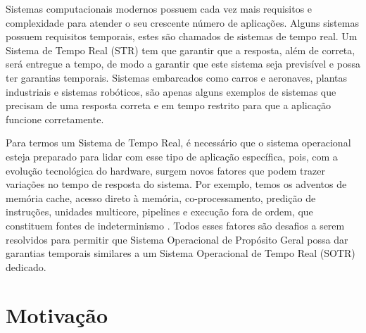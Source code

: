 


Sistemas computacionais modernos possuem cada vez mais requisitos e complexidade para atender o seu crescente número de aplicações. Alguns sistemas possuem requisitos temporais, estes são chamados de sistemas de tempo real. Um Sistema de Tempo Real (STR) tem que garantir que a resposta, além de correta, será entregue a tempo, de modo a garantir que este sistema seja previsível e possa ter garantias temporais. Sistemas embarcados como carros e aeronaves, plantas industriais e sistemas robóticos, são apenas alguns exemplos de sistemas que precisam de uma resposta correta e em tempo restrito para que a aplicação funcione corretamente.

Para termos um Sistema de Tempo Real, é necessário que o sistema operacional esteja preparado para lidar com esse tipo de aplicação específica, pois, com a evolução tecnológica do hardware, surgem novos fatores que podem trazer variações no tempo de resposta do sistema. Por exemplo, temos os adventos de memória cache, acesso direto à memória, co-processamento, predição de instruções, unidades multicore, pipelines e execução fora de ordem, que constituem fontes de indeterminismo \cite{Liu2000, Pratt2004}. Todos esses fatores são desafios a serem resolvidos para permitir que Sistema Operacional de Propósito Geral possa dar garantias temporais similares a um Sistema Operacional de Tempo Real (SOTR) dedicado.

\section{Motivação}

